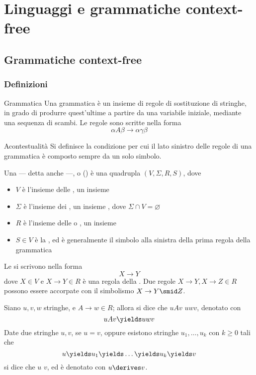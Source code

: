 \documentclass[a4paper, 12pt]{report}
\begin{document}
    \chapter{Linguaggi e grammatiche context-free}

    \section{Grammatiche context-free}

    \subsection{Definizioni}

    \begin{frameddefn}{Grammatica}
        Una grammatica è un insieme di regole di sostituzione di stringhe, in grado di produrre quest'ultime a partire da una variabile iniziale, mediante una sequenza di scambi. Le regole sono scritte nella forma $$\alpha A \beta \to \alpha \gamma \beta$$
    \end{frameddefn}

    \begin{frameddefn}{Acontestualità}
        Si definisce  la condizione per cui il lato sinistro delle regole di una grammatica è composto sempre da un solo simbolo.
    \end{frameddefn}

    \begin{frameddefn}{\CFG}
        Una  --- detta anche  ---, o \CFG () è una quadrupla $(V, \Sigma, R, S)$, dove

        \begin{itemize}
            \item $V$ è l'insieme delle , un insieme 
            \item $\Sigma$ è l'insieme dei , un insieme , dove $\Sigma \cap V = \varnothing$
            \item $R$ è l'insieme delle  o , un insieme 
            \item $S \in V$ è la , ed è generalmente il simbolo alla sinistra della prima regola della grammatica
        \end{itemize}

        Le \CFG si scrivono nella forma $$X \to Y$$ dove $X \in V$ e $X \to Y \in R$ è una regola della \CFG. Due regole $X \to Y, X \to Z \in R$ possono essere accorpate con il simbolismo $X \to Y \smid Z$.

        Siano $u, v, w$ stringhe, e $A \to w \in R$; allora si dice che $uAv$  $uwv$, denotato con $$uAv \yields uwv$$ Date due stringhe $u, v$, se $u = v$, oppure esistono stringhe $u_1, \ldots, u_k$ con $k \ge 0$ tali che $$u \yields u_1 \yields \ldots \yields u_k \yields v$$ si dice che $u$  $v$, ed è denotato con $u \derives v$.
    \end{frameddefn}
\end{document}
